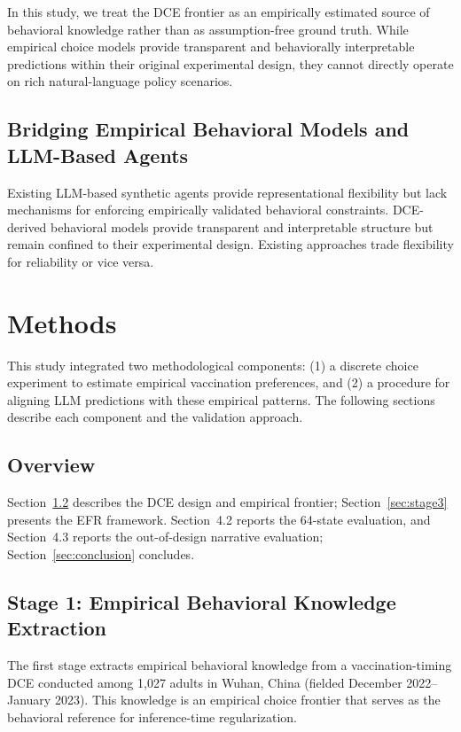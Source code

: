 \documentclass[11pt]{article}
\begin{document}
In this study, we treat the DCE frontier as an empirically estimated source of behavioral knowledge rather than as assumption-free ground truth. While empirical choice models provide transparent and behaviorally interpretable predictions within their original experimental design, they cannot directly operate on rich natural-language policy scenarios.

\subsection{Bridging Empirical Behavioral Models and LLM-Based Agents}

Existing LLM-based synthetic agents provide representational flexibility but lack mechanisms for enforcing empirically validated behavioral constraints\citep{li2026position, tornberg2025validation}. DCE-derived behavioral models provide transparent and interpretable structure but remain confined to their experimental design. Existing approaches trade flexibility for reliability or vice versa.

\section{Methods}
\label{sec:methods}

This study integrated two methodological components: (1) a discrete choice experiment to estimate empirical vaccination preferences, and (2) a procedure for aligning LLM predictions with these empirical patterns. The following sections describe each component and the validation approach.

\subsection{Overview}

Section~\ref{sec:stage1} describes the DCE design and empirical frontier; Section~\ref{sec:stage3} presents the EFR framework. Section~4.2 reports the 64-state evaluation, and Section~4.3 reports the out-of-design narrative evaluation; Section~\ref{sec:conclusion} concludes.

\subsection{Stage 1: Empirical Behavioral Knowledge Extraction}
\label{sec:stage1}

The first stage extracts empirical behavioral knowledge from a vaccination-timing DCE conducted among 1,027 adults in Wuhan, China (fielded December 2022--January 2023). This knowledge is an empirical choice frontier that serves as the behavioral reference for inference-time regularization.
\end{document}
